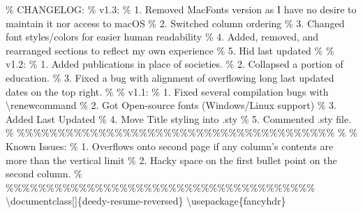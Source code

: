 \documentclass{article}%
\begin{document}
\% CHANGELOG:\newline%
\% v1.3:\newline%
\% 1. Removed MacFonts version as I have no desire to maintain it nor access to macOS\newline%
\% 2. Switched column ordering\newline%
\% 3. Changed font styles/colors for easier human readability\newline%
\% 4. Added, removed, and rearranged sections to reflect my own experience\newline%
\% 5. Hid last updated\newline%
\%\newline%
\% v1.2:\newline%
\% 1. Added publications in place of societies.\newline%
\% 2. Collapsed a portion of education.\newline%
\% 3. Fixed a bug with alignment of overflowing long last updated dates on the top right.\newline%
\%\newline%
\% v1.1:\newline%
\% 1. Fixed several compilation bugs with \textbackslash{}renewcommand\newline%
\% 2. Got Open{-}source fonts (Windows/Linux support)\newline%
\% 3. Added Last Updated\newline%
\% 4. Move Title styling into .sty\newline%
\% 5. Commented .sty file.\newline%
\%\newline%
\%\%\%\%\%\%\%\%\%\%\%\%\%\%\%\%\%\%\%\%\%\%\%\%\%\%\%\%\%\%\%\%\%\%\%\%\%\%\%\newline%
\%\newline%
\% Known Issues:\newline%
\% 1. Overflows onto second page if any column's contents are more than the vertical limit\newline%
\% 2. Hacky space on the first bullet point on the second column.\newline%
\%\newline%
\%\%\%\%\%\%\%\%\%\%\%\%\%\%\%\%\%\%\%\%\%\%\%\%\%\%\%\%\%\%\%\%\%\%\%\%\%\%\newline%
\newline%
\newline%
\textbackslash{}documentclass{[}{]}\{deedy{-}resume{-}reversed\}\newline%
\textbackslash{}usepackage\{fancyhdr\}\newline%
\end{document}
